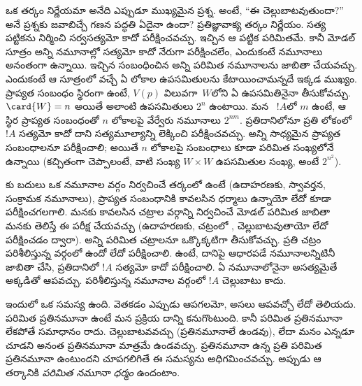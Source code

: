 \documentclass[../../../include/open-logic-section]{subfiles}
\begin{document}


ఒక తర్కం నిర్ణేయమా అనేది ఎప్పుడూ ముఖ్యమైన ప్రశ్న.
అంటే, ``ఈ  చెల్లుబాటవుతుందా?''
అనే ప్రశ్నకు జవాబిచ్చే గణన పద్ధతి ఏదైనా ఉందా?
ప్రతిజ్ఞావాక్య తర్కం నిర్ణేయం. సత్య పట్టికను
నిర్మించి  సర్వసత్యమో
కాదో పరీక్షించవచ్చు. ఇచ్చిన 
ఆ పట్టిక పరిమితమే. కానీ మోడల్ సూత్రం అన్ని నమూనాల్లో
సత్యమో కాదో నేరుగా పరీక్షించలేం, ఎందుకంటే నమూనాలు
అనంతంగా ఉన్నాయి. ఇచ్చిన  సంబంధించిన అన్ని
పరిమిత నమూనాలను జాబితా చేయవచ్చు. ఎందుకంటే ఆ సూత్రంలో
వచ్చే 
ఏ లోకాల ఉపసమితులను కేటాయించామన్నదే ఇక్కడ ముఖ్యం. ప్రాప్యత సంబంధం స్థిరంగా ఉంటే,
$V(p)$ విలువగా~$W$లోని ఏ ఉపసమితినైనా తీసుకోవచ్చు.
$\card{W} = n$ అయితే అలాంటి ఉపసమితులు $2^n$ ఉంటాయి. మన ~$!A$లో $m$
 ఉంటే, ఆ స్థిర ప్రాప్యత సంబంధంతో $n$ లోకాలపై వేర్వేరు నమూనాలు
$2^{nm}$. ప్రతిదానిలోనూ ప్రతి లోకంలో~$!A$ సత్యమో కాదో
దాని సత్యమూల్యాన్ని లెక్కించి పరీక్షించవచ్చు. అన్ని
సాధ్యమైన ప్రాప్యత సంబంధాలనూ పరీక్షించాలి; అయితే $n$
లోకాలపై సంబంధాలు కూడా పరిమిత సంఖ్యలోనే ఉన్నాయి
(కచ్చితంగా చెప్పాలంటే, వాటి సంఖ్య $W \times W$ ఉపసమితుల సంఖ్య, అంటే
$2^{n^2}$).

కు బదులు ఒక నమూనాల వర్గం నిర్వచించే
తర్కంలో ఉంటే (ఉదాహరణకు, స్వావర్తన, సంక్రామక నమూనాలు),
ప్రాప్యత సంబంధానికి కావలసిన ధర్మాలు ఉన్నాయో లేదో కూడా పరీక్షించగలగాలి.
మనకు కావలసిన చట్రాల వర్గాన్ని నిర్వచించే మోడల్
 పరిమిత జాబితా మనకు తెలిస్తే
ఈ పరీక్ష చేయవచ్చు (ఉదాహరణకు, చట్రంలో , 
చెల్లుబాటవుతాయో లేదో పరీక్షించడం ద్వారా).
అన్ని పరిమిత చట్రాలనూ ఒక్కొక్కటిగా తీసుకోవచ్చు. ప్రతి చట్రం
పరిశీలిస్తున్న వర్గంలో ఉందో లేదో పరీక్షించాలి. ఉంటే, దానిపై
ఆధారపడే నమూనాలన్నిటినీ జాబితా చేసి, ప్రతిదానిలో
$!A$ సత్యమో కాదో పరీక్షించాలి. ఏ నమూనాలోనైనా అసత్యమైతే అక్కడితో
ఆపవచ్చు. పరిశీలిస్తున్న నమూనాల వర్గంలో $!A$ చెల్లుబాటు కాదు.

ఇందులో ఒక సమస్య ఉంది. వెతకడం ఎప్పుడు ఆపగలమో,
అసలు ఆపవచ్చో లేదో తెలియదు. 
పరిమిత ప్రతినమూనా ఉంటే మన ప్రక్రియ దాన్ని కనుగొంటుంది.
కానీ పరిమిత ప్రతినమూనా లేకపోతే సమాధానం రాదు.
 చెల్లుబాటవవచ్చు
(ప్రతినమూనాలే ఉండవు), లేదా మనం ఎన్నడూ చూడని అనంత
ప్రతినమూనా మాత్రమే ఉండవచ్చు. ప్రతినమూనా ఉన్న ప్రతి
 పరిమిత ప్రతినమూనా
ఉంటుందని చూపగలిగితే ఈ సమస్యను అధిగమించవచ్చు.
అప్పుడు ఆ తర్కానికి \emph{పరిమిత నమూనా ధర్మం} ఉందంటాం.
\end{document}
